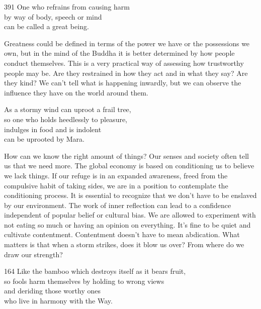 \begin{dhpVerse}{391}
\label{dhp-391}
One who refrains from causing harm\\
by way of body, speech or mind\\
can be called a great being.
\end{dhpVerse}

\begin{dhpRefl}
  Greatness could be defined in terms of the power we have or the possessions we
  own, but in the mind of the Buddha it is better determined by how people
  conduct themselves. This is a very practical way of assessing how trustworthy
  people may be. Are they restrained in how they act and in what they say? Are
  they kind? We can’t tell what is happening inwardly, but we can observe the
  influence they have on the world around them.
\end{dhpRefl}


\begin{dhpVerse}{7}
\label{dhp-7}
As a stormy wind can uproot a frail tree,\\
so one who holds heedlessly to pleasure,\\
indulges in food and is indolent\\
can be uprooted by Mara.
\end{dhpVerse}

\begin{dhpRefl}
  How can we know the right amount of things? Our senses and society often tell
  us that we need more. The global economy is based on conditioning us to
  believe we lack things. If our refuge is in an expanded awareness, freed from
  the compulsive habit of taking sides, we are in a position to contemplate the
  conditioning process. It is essential to recognize that we don’t have to be
  enslaved by our environment. The work of inner reflection can lead to a
  confidence independent of popular belief or cultural bias. We are allowed to
  experiment with not eating so much or having an opinion on everything. It’s
  fine to be quiet and cultivate contentment. Contentment doesn’t have to mean
  abdication. What matters is that when a storm strikes, does it blow us over?
  From where do we draw our strength?
\end{dhpRefl}


\begin{dhpVerse}{164}
\label{dhp-164}
Like the bamboo which destroys itself as it bears fruit,\\
so fools harm themselves by holding to wrong views\\
and deriding those worthy ones\\
who live in harmony with the Way.
\end{dhpVerse}

